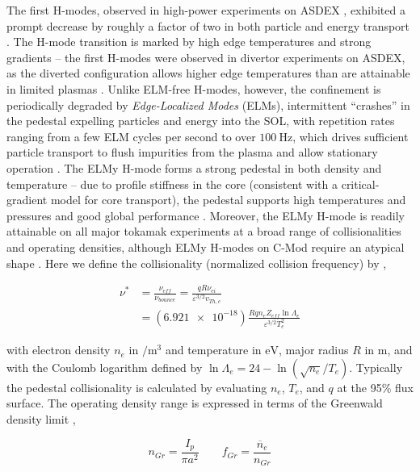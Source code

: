 The first H-modes, observed in high-power experiments on ASDEX \cite{Wagner1982,Keilhacker1984}, exhibited a prompt decrease by roughly a factor of two in both particle and energy transport \cite{Wagner1982}.  The H-mode transition is marked by high edge temperatures and strong gradients -- the first H-modes were observed in divertor experiments on ASDEX, as the diverted configuration allows higher edge temperatures than are attainable in limited plasmas \cite{Keilhacker1984}.  Unlike ELM-free H-modes, however, the confinement is periodically degraded by \emph{Edge-Localized Modes} (ELMs), intermittent ``crashes'' in the pedestal expelling particles and energy into the SOL, with repetition rates ranging from a few ELM cycles per second to over $\SI{100}{\hertz}$, which drives sufficient particle transport to flush impurities from the plasma and allow stationary operation \cite{Keilhacker1984,Zohm1996}.  The ELMy H-mode forms a strong pedestal in both density and temperature -- due to profile stiffness in the core (consistent with a critical-gradient model for core transport), the pedestal supports high temperatures and pressures and good global performance \cite{Greenwald1997,Suttrop2000,Schneider2013}.  Moreover, the ELMy H-mode is readily attainable on all major tokamak experiments at a broad range of collisionalities and operating densities, although ELMy H-modes on C-Mod require an atypical shape \cite{Hughes2012,Hughes2013}.  Here we define the collisionality (normalized collision frequency) by \cite{Sauter1999},

\begin{equation}\label{eq:nustar}
 \begin{aligned}
 \nu^* &= \frac{\nu_{eff}}{\nu_{bounce}} = \frac{qR\nu_{ei}}{\varepsilon^{3/2} v_{Th,e}}\\ &= \left(\num{6.921e-18}\right) \frac{Rqn_e Z_{eff} \ln \Lambda_e}{\varepsilon^{3/2} T_e^2}
 \end{aligned}
\end{equation}

\noindent with electron density $n_e$ in $\si{\per\meter\cubed}$ and temperature in $\si{\electronvolt}$, major radius $R$ in $\si{\meter}$, and with the Coulomb logarithm defined by $\ln \Lambda_e = 24 - \ln\left(\sqrt{n_e}/T_e\right)$.  Typically the pedestal collisionality is calculated by evaluating $n_e$, $T_e$, and $q$ at the 95\% flux surface.  The operating density range is expressed in terms of the Greenwald density limit \cite{Greenwald1988},

\begin{equation}\label{eq:GDL}
  n_{Gr} = \frac{I_p}{\pi a^2} \qquad f_{Gr} = \frac{\overline{n}_e}{n_{Gr}}
\end{equation}

